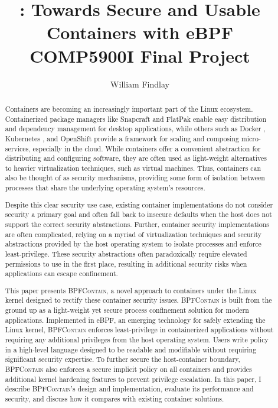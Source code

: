 \documentclass[dvipsnames, 12pt]{article}
\title{\Large \bpfcontain: Towards Secure and Usable Containers with eBPF\\{\large COMP5900I Final Project}}
\author{William Findlay}
\def\bpfcontain{\textsc{BPFContain}}
\begin{document}

\maketitle
\thispagestyle{empty}

\vfill
\begin{abstract}
\noindent
Containers are becoming an increasingly important part of the Linux ecosystem.  Containerized package managers like Snapcraft \cite{snap} and FlatPak \cite{flatpak} enable easy distribution and dependency management for desktop applications, while others such as Docker \cite{docker}, Kubernetes \cite{kubernetes}, and OpenShift \cite{openshift} provide a framework for scaling and composing micro-services, especially in the cloud.  While containers offer a convenient abstraction for distributing and configuring software, they are often used as light-weight alternatives to heavier virtualization techniques, such as virtual machines. Thus, containers can also be thought of as security mechanisms, providing some form of isolation between processes that share the underlying operating system's resources.

Despite this clear security use case, existing container implementations do not consider security a primary goal and often fall back to insecure defaults when the host does not support the correct security abstractions. Further, container security implementations are often complicated, relying on a myriad of virtualization techniques and security abstractions provided by the host operating system to isolate processes and enforce least-privilege. These security abstractions often paradoxically require elevated permissions to use in the first place, resulting in additional security risks when applications can escape confinement.

This paper presents \bpfcontain{}, a novel approach to containers under the Linux kernel designed to rectify these container security issues. \bpfcontain{} is built from the ground up as a light-weight yet secure process confinement solution for modern applications. Implemented in eBPF, an emerging technology for safely extending the Linux kernel, \bpfcontain{} enforces least-privilege in containerized applications without requiring any additional privileges from the host operating system. Users write policy in a high-level language designed to be readable and modifiable without requiring significant security expertise. To further secure the host-container boundary, \bpfcontain{} also enforces a secure implicit policy on all containers and provides additional kernel hardening features to prevent privilege escalation. In this paper, I describe \bpfcontain{}'s design and implementation, evaluate its performance and security, and discuss how it compares with existing container solutions.

\end{abstract}
\vfill
\vfill
\end{document}

